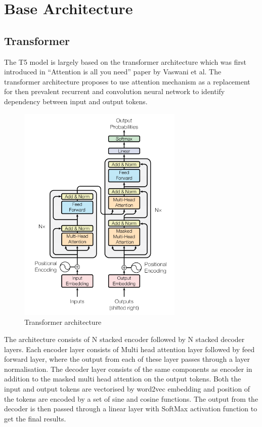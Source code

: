 \section{Base Architecture}

\subsection{Transformer}
The T5 model is largely based on the transformer architecture which was first introduced in “Attention is all you need” paper by Vaswani et al. The transformer architecture proposes to use attention mechanism as a replacement for then prevalent recurrent and convolution neural network to identify dependency between input and output tokens. 
\begin{figure}[H]
\centering
\includegraphics[width=0.7\textwidth]{images/transformer.png}
\caption{Transformer architecture}
\label{fig:transformer}
\end{figure}

The architecture consists of N stacked encoder followed by N stacked decoder layers. Each encoder layer consists of Multi head attention layer followed by feed forward layer, where the output from each of these layer passes through a layer normalisation. The decoder layer consists of the same components as encoder in addition to the masked multi head attention on the output tokens. Both the input and output tokens are vectorised by word2vec embedding and position of the tokens are encoded by a set of sine and cosine functions. The output from the decoder is then passed through a linear layer with SoftMax activation function to get the final results. 

